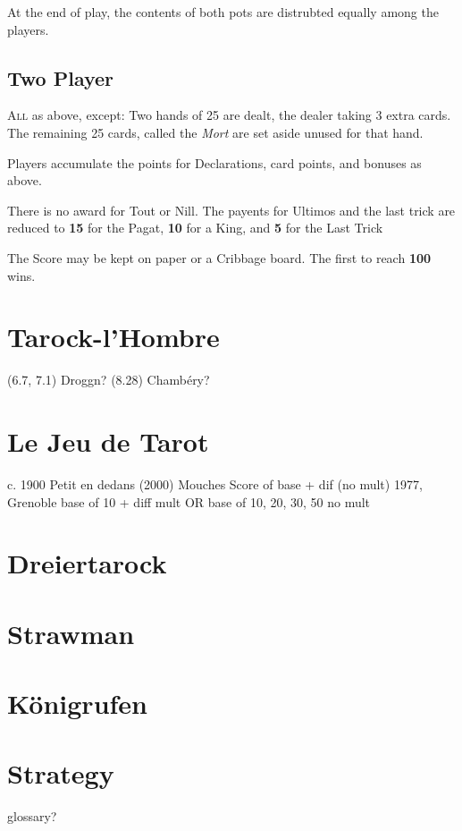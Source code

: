 \documentclass[ebook,12pt,twoside,openright,extrafontsizes,final]{memoir}
\begin{document}
At the end of play, the contents of both pots are distrubted equally among the players.



\section{Two Player}
\lettrine{A}{ll} as above, except:
Two hands of 25 are dealt, the dealer taking 3 extra cards.  The remaining 25 cards, called
the \emph{Mort} are set aside unused for that hand.

Players accumulate the points for Declarations, card points, and bonuses as above. 

There is no award for {Tout} or {Nill}. The payents for Ultimos and the last trick are 
reduced to \textbf{15} for the Pagat, \textbf{10} for a King, and \textbf{5} for the
Last Trick

The Score may be kept on paper or a Cribbage board.  The first to reach \textbf{100} wins.


\chapter{Tarock-l’Hombre}
(6.7, 7.1)
Droggn?
(8.28) Chambéry?


\chapter{Le Jeu de Tarot}
c. 1900
Petit en dedans (2000)
Mouches
Score of base + dif (no mult) 1977, Grenoble
base of 10 + diff mult OR 
base of 10, 20, 30, 50 no mult


\chapter{Dreiertarock}

\chapter{Strawman}

\chapter{Königrufen}

\chapter{Strategy}

glossary?
\end{document}
